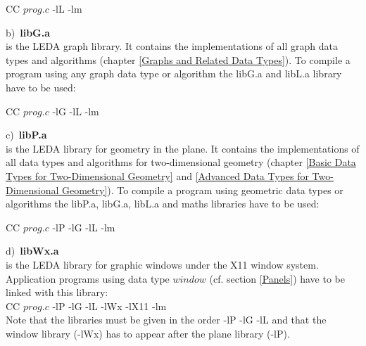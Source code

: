 \smallskip
CC $prog.c$ -lL -lm

\smallskip
b)\ {\bf libG.a}\\
is the LEDA graph library. It contains the implementations of all graph 
data types and algorithms (chapter \ref{Graphs and Related Data Types}). 
To compile a program using any graph 
data type or algorithm the libG.a and libL.a library have to be used:

\smallskip
CC $prog.c$ -lG -lL -lm

\smallskip
c)\ {\bf libP.a}\\
is the LEDA library for geometry in the plane. It contains the 
implementations of all data types and algorithms for two-dimensional 
geometry (chapter \ref{Basic Data Types for Two-Dimensional Geometry}
and \ref{Advanced Data Types for Two-Dimensional Geometry}). 
To compile a program using geometric data 
types or algorithms the libP.a, libG.a, libL.a and maths libraries have 
to be used:

\smallskip
CC $prog.c$ -lP -lG -lL -lm 

\smallskip
\medskip
d)\ {\bf libWx.a}\\
is the LEDA library for graphic windows under the X11 
window system. Application programs using data type $window$ 
(cf. section \ref{Panels}) have to be linked with this library:\\

CC $prog.c$ -lP -lG -lL -lWx -lX11 -lm\\

Note that the libraries must be given in the order -lP -lG -lL 
and that the window library (-lWx) has to appear after the
plane library (-lP).

